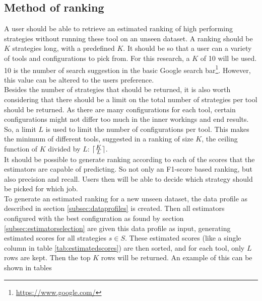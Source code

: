 \subsection{Method of ranking}
A user should be able to retrieve an estimated ranking of high performing strategies without running these tool on an unseen dataset. A ranking should be $K$ strategies long, with a predefined $K$. It should be so that a user can a variety of tools and configurations to pick from. For this research, a $K$ of 10 will be used. 10 is the number of search suggestion in the basic Google search bar\footnote{\url{https://www.google.com/}}. However, this value can be altered to the users preference.
\\Besides the number of strategies that should be returned, it is also worth considering that there should be a limit on the total number of strategies per tool should be returned. As there are many configurations for each tool, certain configurations might not differ too much in the inner workings and end results. So, a limit $L$ is used to limit the number of configurations per tool. This makes the minimum of different tools, suggested in a ranking of size $K$, the ceiling function of $K$ divided by $L$: $\lceil\frac{K}{L}\rceil$. 
\\It should be possible to generate ranking according to each of the scores that the estimators are capable of predicting. So not only an F1-score based ranking, but also precision and recall. Users then will be able to decide which strategy should be picked for which job.
\\To generate an estimated ranking for a new unseen dataset, the data profile as described in section \ref{subsec:dataprofiles} is created. Then all estimators configured with the best configuration as found by section \ref{subsec:estimatorselection} are given this data profile as input, generating estimated scores for all strategies $s \in S$. These estimated scores (like a single column in table \ref{tab:estimatedscores}) are then sorted, and for each tool, only $L$ rows are kept. Then the top $K$ rows will be returned. An example of this can be shown in tables 


